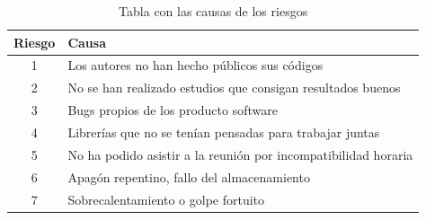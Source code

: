 \begin{table}[H]
\centering
\begin{tabular}{|c|l|}
\hline
\rowcolor[HTML]{C0C0C0} 
{\color[HTML]{000000} \textbf{Riesgo}} & {\color[HTML]{000000} \textbf{Causa}}                                \\ \hline
\rowcolor[HTML]{EFEFEF} 
{\color[HTML]{000000} 1}               & {\color[HTML]{000000} Los autores no han hecho públicos sus códigos} \\ \hline
\rowcolor[HTML]{EFEFEF} 
{\color[HTML]{000000} 2} & {\color[HTML]{000000} No se han realizado estudios que consigan resultados buenos}    \\ \hline
\rowcolor[HTML]{EFEFEF} 
{\color[HTML]{000000} 3}               & {\color[HTML]{000000} Bugs propios de los producto software}         \\ \hline
\rowcolor[HTML]{EFEFEF} 
{\color[HTML]{000000} 4} & {\color[HTML]{000000} Librerías que no se tenían pensadas para trabajar juntas}       \\ \hline
\rowcolor[HTML]{EFEFEF} 
{\color[HTML]{000000} 5} & {\color[HTML]{000000} No ha podido asistir a la reunión por incompatibilidad horaria} \\ \hline
\rowcolor[HTML]{EFEFEF} 
{\color[HTML]{000000} 6}               & {\color[HTML]{000000} Apagón repentino, fallo del almacenamiento}    \\ \hline
\rowcolor[HTML]{EFEFEF} 
{\color[HTML]{000000} 7}               & {\color[HTML]{000000} Sobrecalentamiento o golpe fortuito}           \\ \hline
\end{tabular}
\caption{Tabla con las causas de los riesgos}
\end{table}

